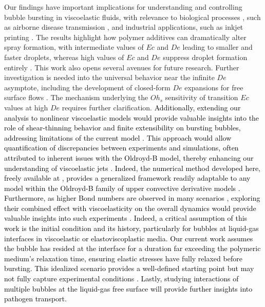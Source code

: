 \documentclass{jfm}
\newcommand{\VS}[1]{{\textcolor{black}{#1}}}
\newcommand{\oo}{\color{magenta} \normalfont}
\newcommand{\bb}{\color{black} \normalfont}
\begin{document}
Our findings have important implications for understanding and controlling bubble bursting in viscoelastic fluids, with relevance to biological processes \citep{walls2017quantifying}, such as airborne disease transmission \citep{bourouiba2021fluid}, and industrial applications, such as inkjet printing \citep{lohse2022fundamental}.
\oo
The results highlight how polymer additives can dramatically alter spray formation, with intermediate values of $Ec$ and $De$ leading to smaller and faster droplets, whereas high values of $Ec$ and $De$ suppress droplet formation entirely \citep{kant2023bag}.
\bb
This work also opens several avenues for future research. Further investigation is needed into the universal behavior near the infinite $De$ asymptote, including the development of closed-form $De$ expansions for free surface flows \citep{sen2021retraction,francca2024elasto,sen2024elastocapillary,boyko2024flow,hinch2024fast}. The mechanism underlying the $Oh_s$ sensitivity of transition $Ec$ values at high $De$ requires further clarification. \VS{Additionally, extending our analysis to nonlinear viscoelastic models would provide valuable insights into the role of shear-thinning behavior and finite extensibility on bursting bubbles, addressing limitations of the current model \citep{zinelis2023transition,mckinley2002filament,snoeijer2020relationship}. This approach would allow quantification of discrepancies between experiments and simulations, often attributed to inherent issues with the Oldroyd-B model, thereby enhancing our understanding of viscoelastic jets \citep{gaillard2024does}.
Indeed, the numerical method developed here, freely available at \citet{Sanjay2024code}, provides a generalized framework readily adaptable to any model within the Oldroyd-B family of upper convective derivative models \citep{snoeijer2020relationship}.
Furthermore, as higher Bond numbers are observed in many scenarios \citep{walls2015jet, ghabache2014liquid, deike2018dynamics, krishnan2017scaling}, exploring their combined effect with viscoelasticity on the overall dynamics would provide valuable insights into such experiments \citep{rodriguez2023bubble}.
\oo
Indeed, a critical assumption of this work is the initial condition and its history, particularly for bubbles at liquid-gas interfaces in viscoelastic or elastoviscoplastic media. Our current work assumes the bubble has resided at the interface for a duration far exceeding the polymeric medium's relaxation time, ensuring elastic stresses have fully relaxed before bursting. This idealized scenario provides a well-defined starting point but may not fully capture experimental conditions \citep{cheny1996extravagant,deoclecio2023drop}.
\bb
Lastly, studying interactions of multiple bubbles \citep{singh2019numerical} at the liquid-gas free surface will provide further insights into pathogen transport.}
\end{document}
